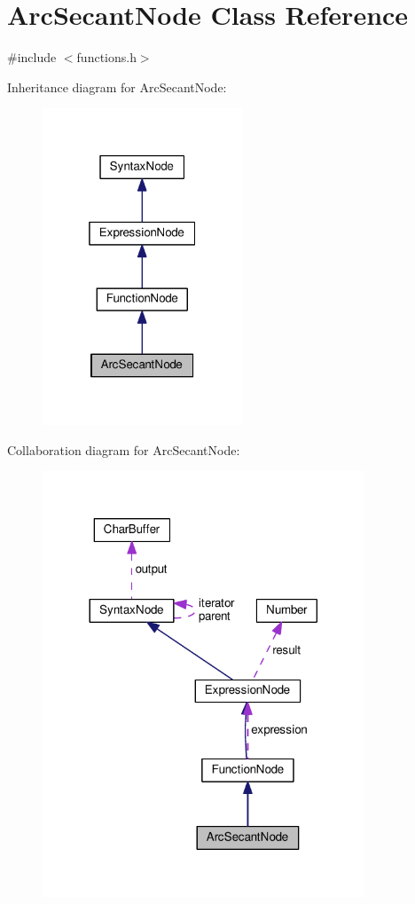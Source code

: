 \hypertarget{classArcSecantNode}{}\section{Arc\+Secant\+Node Class Reference}
\label{classArcSecantNode}


{\ttfamily \#include $<$functions.\+h$>$}



Inheritance diagram for Arc\+Secant\+Node\+:\nopagebreak
\begin{figure}[H]
\begin{center}
\leavevmode
\includegraphics[width=169pt]{classArcSecantNode__inherit__graph}
\end{center}
\end{figure}


Collaboration diagram for Arc\+Secant\+Node\+:\nopagebreak
\begin{figure}[H]
\begin{center}
\leavevmode
\includegraphics[width=272pt]{classArcSecantNode__coll__graph}
\end{center}
\end{figure}
